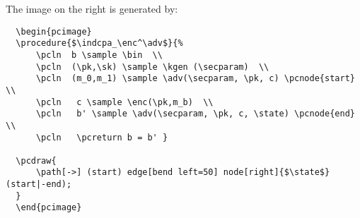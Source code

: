 \documentclass[a4paper]{report}
\begin{document}
  \begin{center}
  
  \end{center}
  
  The image on the right is generated by:
  \begin{lstlisting}
  \begin{pcimage}
  \procedure{$\indcpa_\enc^\adv$}{%
	  \pcln  b \sample \bin  \\
	  \pcln  (\pk,\sk) \sample \kgen (\secparam)  \\
	  \pcln  (m_0,m_1) \sample \adv(\secparam, \pk, c) \pcnode{start}  \\
	  \pcln   c \sample \enc(\pk,m_b)  \\
	  \pcln   b' \sample \adv(\secparam, \pk, c, \state) \pcnode{end} \\
	  \pcln   \pcreturn b = b' }
	  
  \pcdraw{
	  \path[->] (start) edge[bend left=50] node[right]{$\state$} (start|-end);
  }
  \end{pcimage}
  \end{lstlisting}
  
\end{document}
